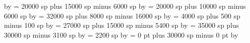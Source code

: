 {\multiply\spacearoundminor by \grefactor %
%
\spacearoundmaior = 20000 sp plus 15000 sp minus 6000 sp%
\multiply\spacearoundmaior by \grefactor %
%
\spacearoundfinalis = 20000 sp plus 10000 sp minus 6000 sp%
\multiply\spacearoundfinalis by \grefactor %
%
\spacebeforefinalfinalis= 32000 sp plus 8000 sp minus 16000 sp%
\multiply\spacebeforefinalfinalis by \grefactor %
%
\spacearoundclefbars= 4000 sp plus 500 sp minus 100 sp%
\multiply\spacearoundclefbars by \grefactor %
%
\textbartextspace = 27000 sp plus 15000 sp minus 5400 sp%
\multiply\textbartextspace by \grefactor %
%
\notebarspace = 35000 sp plus 30000 sp minus 3100 sp%
\multiply\notebarspace by \grefactor %
%
\maximumspacewithoutdash = 2200 sp%
\multiply\maximumspacewithoutdash by \grefactor %
%
\afterclefnospace = 0 pt plus 30000 sp minus 0 pt%
\multiply\afterclefnospace by \grefactor %
\relax %
}
